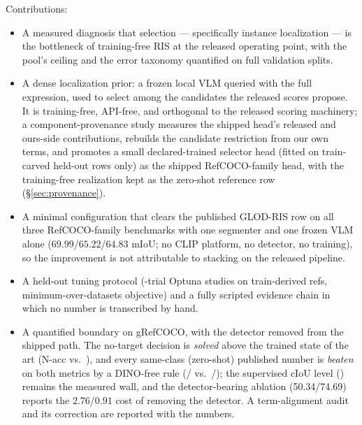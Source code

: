 Contributions:
\begin{itemize}\itemsep2pt
  \item A measured diagnosis that selection --- specifically instance
  localization --- is the bottleneck of training-free RIS at the released
  operating point, with the pool's ceiling and the error taxonomy quantified
  on full validation splits.
  \item A dense localization prior: a frozen local VLM queried with the full
  expression, used to select among the candidates the released scores
  propose. It is training-free, API-free, and orthogonal to the released
  scoring machinery; a component-provenance study measures the shipped head's
  released and ours-side contributions, rebuilds the candidate restriction
  from our own terms, and promotes a small declared-trained selector head
  (fitted on train-carved held-out rows only) as the shipped RefCOCO-family
  head, with the training-free realization kept as the zero-shot reference
  row (\S\ref{sec:provenance}).
  \item A minimal configuration that clears the published GLOD-RIS row on all
  three RefCOCO-family benchmarks with one segmenter and one frozen VLM alone
  ($69.99$/$65.22$/$64.83$ mIoU; no CLIP platform, no detector, no training),
  so the improvement is not attributable to stacking on the released
  pipeline.
  \item A held-out tuning protocol (\studyTrials{}-trial Optuna studies on
  train-derived refs, minimum-over-datasets objective) and a fully scripted
  evidence chain in which no number is transcribed by hand.
  \item A quantified boundary on gRefCOCO, with the detector removed from the
  shipped path. The no-target decision is \emph{solved} above the trained
  state of the art (N-acc \wallCombN{} vs.\ \wallTrainedNAcc{}), and every
  same-class (zero-shot) published number is \emph{beaten} on both metrics by
  a DINO-free rule (\grefCIoU{}/\grefGIoU{} vs.\
  \grefZeroShotCIoU{}/\grefZeroShotGIoU{}); the supervised cIoU level
  (\grefPubCIoU) remains the measured wall, and the detector-bearing ablation
  (50.34/74.69) reports the $2.76$/$0.91$ cost of removing the detector. A
  term-alignment audit and its correction are reported with the numbers.
\end{itemize}

